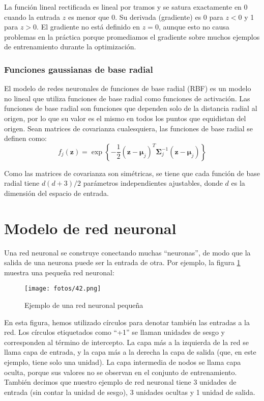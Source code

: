 La función lineal rectificada es lineal por tramos y se satura exactamente en $0$ cuando la entrada $z$ es menor que $0$. Su derivada (gradiente) es 0 para $z<0$ y 1 para $z > 0$. El gradiente no está definido en $z = 0$, aunque esto no causa problemas en la práctica porque promediamos el gradiente sobre muchos ejemplos de entrenamiento durante la optimización.

\subsubsection{Funciones gaussianas de base radial}

El modelo de redes neuronales de funciones de base radial (RBF) es un modelo no lineal que utiliza funciones de base radial como funciones de activación. Las funciones de base radial son funciones que dependen solo de la distancia radial al origen, por lo que su valor es el mismo en todos los puntos que equidistan del origen. Sean matrices de covarianza cualesquiera, las funciones de base radial se definen como:
\begin{equation}
f_j(\mathbf{z}) = \exp\left\{-\frac{1}{2}(\mathbf{z} - \boldsymbol{\mu}_j)^T \boldsymbol{\Sigma}_j^{-1}(\mathbf{z} - \boldsymbol{\mu}_j)\right\}
\end{equation}

Como las matrices de covarianza son simétricas, se tiene que cada función de base radial tiene $d(d + 3)/2$ parámetros independientes ajustables, donde $d$ es la dimensión del espacio de entrada. \\


\section{Modelo de red neuronal}

Una red neuronal se construye conectando muchas ``neuronas'', de modo que la salida de una neurona puede ser la entrada de otra. Por ejemplo, la figura \ref{fig:7.3} muestra una pequeña red neuronal:

\begin{figure}[h]
\centering
\texttt{[image: fotos/42.png]}
\caption{Ejemplo de una red neuronal pequeña}
\label{fig:7.3}
\end{figure}

En esta figura, hemos utilizado círculos para denotar también las entradas a la red. Los círculos etiquetados como ``+1'' se llaman unidades de sesgo y corresponden al término de intercepto. La capa más a la izquierda de la red se llama capa de entrada, y la capa más a la derecha la capa de salida (que, en este ejemplo, tiene solo una unidad). La capa intermedia de nodos se llama capa oculta, porque sus valores no se observan en el conjunto de entrenamiento. También decimos que nuestro ejemplo de red neuronal tiene 3 unidades de entrada (sin contar la unidad de sesgo), 3 unidades ocultas y 1 unidad de salida. \\

